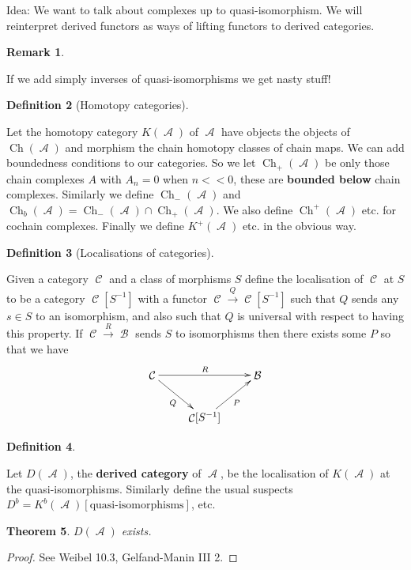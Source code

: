 \documentclass[10pt,]{book}
\newcommand{\lt}{<}
\newcommand{\terminology}[1]{\textbf{#1}}
\theoremstyle{plain}
\newtheorem{theorem}{Theorem}[section]
\theoremstyle{definition}
\newtheorem{definition}[theorem]{Definition}
\newtheorem{remark}[theorem]{Remark}
\numberwithin{equation}{section}
\DeclareMathOperator{\Ch}{Ch}
\DeclareMathOperator{\cA}{\mathcal{A}}
\DeclareMathOperator{\cB}{\mathcal{B}}
\DeclareMathOperator{\cC}{\mathcal{C}}
\begin{document}
          Idea: We want to talk about complexes up to quasi-isomorphism.
          We will reinterpret derived functors as ways of lifting functors to derived categories.
\begin{remark}\label{remark-1}

            If we add simply inverses of quasi-isomorphisms we get nasty stuff!
          \end{remark}
\begin{definition}[Homotopy categories]\label{definition-21}

            Let the homotopy category \(K(\cA)\) of \(\cA\) have objects the objects of \(\Ch(\cA)\) and morphism the chain homotopy classes of chain maps.
            We can add boundedness conditions to our categories.
            So we let \(\Ch_{+}(\cA)\) be only those chain complexes \(A\) with \(A_n = 0\) when \(n \lt \lt 0\), these are \terminology{bounded below} chain complexes.
            Similarly we define \(\Ch_-(\cA)\) and \(\Ch_b(\cA) = \Ch_-(\cA) \cap \Ch_+(\cA)\).
            We also define \(\Ch^+(\cA)\) etc. for cochain complexes.
            Finally we define \(K^+(\cA)\) etc. in the obvious way.
          \end{definition}
\begin{definition}[Localisations of categories]\label{definition-22}

            Given a category \(\cC\) and a class of morphisms \(S\) define the localisation of \(\cC\) at \(S\) to be a category \(\cC[S^{-1}]\) with a functor \(\cC \xrightarrow{Q} \cC[S^{-1}]\) such that \(Q\) sends any \(s\in S\) to an isomorphism, and also such that \(Q\) is universal with respect to having this property.
            If \(\cC \xrightarrow{R} \cB\) sends \(S\) to isomorphisms then there exists some \(P\) so that we have
            \[
              \xymatrix{
              \cC \ar[rr]^R\ar[dr]_Q &&\cB\\
              &\cC[S^{-1}] \ar[ur]_{P}&
              }
            \]\end{definition}
\begin{definition}\label{definition-23}

            Let \(D(\cA)\), the \terminology{derived category} of \(\cA\), be the localisation of \(K(\cA)\) at the quasi-isomorphisms.
            Similarly define the usual suspects \(D^b = K^b(\cA)[\text{quasi-isomorphisms}]\), etc.
          \end{definition}
\begin{theorem}\label{theorem-3}
\(D(\cA)\) exists.
          \end{theorem}
\begin{proof}
See Weibel 10.3, Gelfand-Manin III 2. \end{proof}
\par
\end{document}

